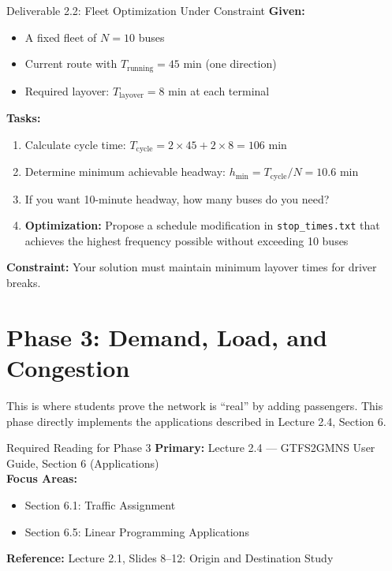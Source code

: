 \documentclass[11pt,letterpaper]{article}
\begin{document}
\begin{deliverablebox}{Deliverable 2.2: Fleet Optimization Under Constraint}
\textbf{Given:}
\begin{itemize}[nosep]
    \item A fixed fleet of $N = 10$ buses
    \item Current route with $T_{\text{running}} = 45$ min (one direction)
    \item Required layover: $T_{\text{layover}} = 8$ min at each terminal
\end{itemize}

\textbf{Tasks:}
\begin{enumerate}
    \item Calculate cycle time: $T_{\text{cycle}} = 2 \times 45 + 2 \times 8 = 106$ min
    \item Determine minimum achievable headway: $h_{\min} = T_{\text{cycle}} / N = 10.6$ min
    \item If you want 10-minute headway, how many buses do you need?
    \item \textbf{Optimization:} Propose a schedule modification in \texttt{stop\_times.txt} that achieves the highest frequency possible without exceeding 10 buses
\end{enumerate}

\textbf{Constraint:} Your solution must maintain minimum layover times for driver breaks.
\end{deliverablebox}

\section{Phase 3: Demand, Load, and Congestion}

This is where students prove the network is ``real'' by adding passengers. This phase directly implements the applications described in Lecture 2.4, Section 6.

\begin{readingbox}{Required Reading for Phase 3}
\textbf{Primary:} Lecture 2.4 --- GTFS2GMNS User Guide, Section 6 (Applications)\\
\textbf{Focus Areas:}
\begin{itemize}[nosep]
    \item Section 6.1: Traffic Assignment
    \item Section 6.5: Linear Programming Applications
\end{itemize}
\textbf{Reference:} Lecture 2.1, Slides 8--12: Origin and Destination Study
\end{readingbox}
\end{document}

